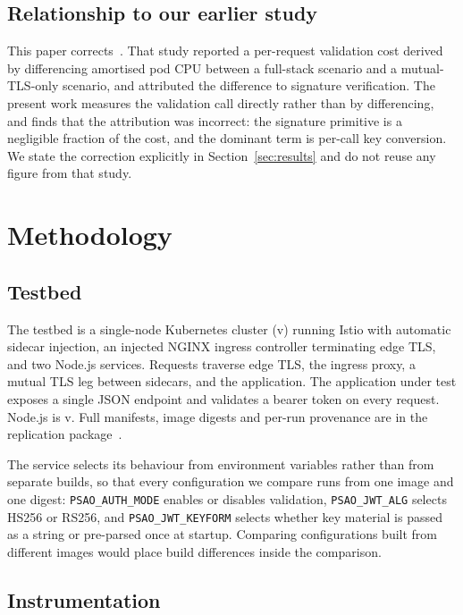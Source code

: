 \documentclass[pdflatex,sn-basic,twocolumn]{sn-jnl}
\begin{document}
\subsection{Relationship to our earlier study}

This paper corrects~\cite{sikdar2026quantifying}. That study reported a
per-request validation cost derived by differencing amortised pod CPU between a
full-stack scenario and a mutual-TLS-only scenario, and attributed the
difference to signature verification. The present work measures the validation
call directly rather than by differencing, and finds that the attribution was
incorrect: the signature primitive is a negligible fraction of the cost, and the
dominant term is per-call key conversion. We state the correction explicitly in
Section~\ref{sec:results} and do not reuse any figure from that study.

\section{Methodology}\label{sec:method}

\subsection{Testbed}

The testbed is a single-node Kubernetes cluster (v\EnvKubernetesVersion) running
Istio with automatic sidecar injection, an injected NGINX ingress controller
terminating edge TLS, and two Node.js services. Requests traverse edge TLS, the
ingress proxy, a mutual TLS leg between sidecars, and the application. The
application under test exposes a single JSON endpoint and validates a bearer
token on every request. Node.js is v\EnvNodeVersion. Full manifests, image
digests and per-run provenance are in the replication
package~\cite{psaoartifact2026}.

The service selects its behaviour from environment variables rather than from
separate builds, so that every configuration we compare runs from one image and
one digest: \texttt{PSAO\_AUTH\_MODE} enables or disables validation,
\texttt{PSAO\_JWT\_ALG} selects HS256 or RS256, and
\texttt{PSAO\_JWT\_KEYFORM} selects whether key material is passed as a string
or pre-parsed once at startup. Comparing configurations built from different
images would place build differences inside the comparison.

\subsection{Instrumentation}
\end{document}
